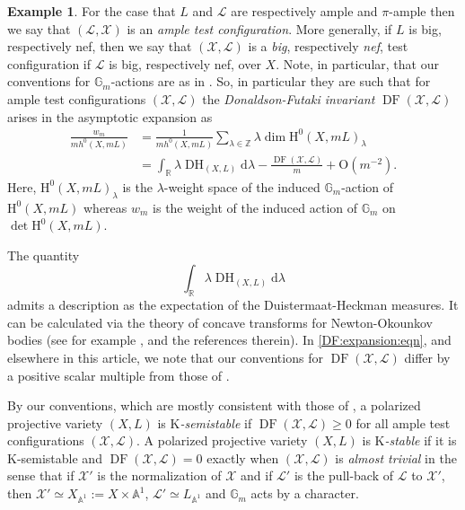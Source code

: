 \documentclass[12pt]{amsart}
\renewcommand{\geq}{\geqslant}
\renewcommand{\H}{\mathrm{H}}                          %
\newcommand{\K}{\mathrm{K}}
\renewcommand{\AA}{\mathbb{A}} %
\newcommand{\RR}{\mathbb{R}} %
\newcommand{\ZZ}{\mathbb{Z}} %
\newcommand{\GG}{\mathbb{G}}
\theoremstyle{definition}
\newtheorem{example}[theorem]{Example}
\numberwithin{equation}{section}
\begin{document}
\begin{example}
For the case that $L$ and $\mathcal{L}$ are respectively ample and $\pi$-ample then we say that $(\mathcal{L},\mathcal{X})$ is an \emph{ample test configuration}.  More generally, if $L$ is big, respectively nef, then we say that $(\mathcal{X},\mathcal{L})$ is a \emph{big}, respectively \emph{nef}, test configuration if $\mathcal{L}$ is big, respectively nef, over $X$.
  Note, in particular, that our conventions for $\GG_m$-actions are as in \cite{Boucksom-Hisamoto-Jonsson:2016}.  So, in particular they are such that for ample test configurations $(\mathcal{X},\mathcal{L})$ the \emph{Donaldson-Futaki invariant} $\operatorname{DF}(\mathcal{X},\mathcal{L})$ arises in the asymptotic expansion as
\begin{equation}\label{DF:expansion:eqn}
\begin{split}
\frac{w_m}{m h^0(X,mL)} & = \frac{1}{m h^0(X,mL)}\sum_{\lambda \in \ZZ} \lambda \dim \H^0(X,mL)_{\lambda} \\
&= \int_{\RR} \lambda \operatorname{DH}_{(X,L)} \mathrm{d}\lambda - \frac{\operatorname{DF}(\mathcal{X},\mathcal{L})}{m} + \mathrm{O}(m^{-2}) \text{.}
\end{split}
\end{equation}
Here, $\H^0(X,mL)_{\lambda}$ is the $\lambda$-weight space of the induced $\GG_m$-action of $\H^0(X,mL)$ whereas $w_m$ is the weight of the induced action of $\GG_m$ on $\operatorname{det} \H^0(X,mL)$.  

The quantity 
$$
\int_{\RR} \lambda \operatorname{DH}_{(X,L)} \mathrm{d}\lambda
$$
admits a description as the expectation of the {D}uistermaat-{H}eckman measures.  It can be calculated via the theory of concave transforms for Newton-Okounkov bodies (see for example \cite{Grieve:MVT:2019}, \cite{Grieve:chow:approx} and the references therein).  In \eqref{DF:expansion:eqn}, and elsewhere in this article, we note that our conventions for $\operatorname{DF}(\mathcal{X},\mathcal{L})$ differ by a positive scalar multiple from those of \cite{Boucksom-Hisamoto-Jonsson:2016}.  

By our conventions, which are mostly consistent with those of \cite{Boucksom-Hisamoto-Jonsson:2016}, a polarized projective variety $(X,L)$ is \emph{$\K$-semistable} if 
$\operatorname{DF}(\mathcal{X},\mathcal{L}) \geq 0$ for all ample test configurations $(\mathcal{X},\mathcal{L})$.
A polarized projective variety $(X,L)$ is \emph{$\K$-stable} if it is $\K$-semistable and $\operatorname{DF}(\mathcal{X},\mathcal{L}) = 0$ exactly when $(\mathcal{X},\mathcal{L})$ is \emph{almost trivial} in the sense that if $\mathcal{X}'$ is the normalization of $\mathcal{X}$ and if $\mathcal{L}'$ is the pull-back of $\mathcal{L}$ to $\mathcal{X}'$, then 
$\mathcal{X}' \simeq X_{\AA^1} := X \times \AA^1$, $\mathcal{L}' \simeq  L_{\AA^1}$ and $\GG_m$ acts by a character. 
\end{example}
\end{document}
